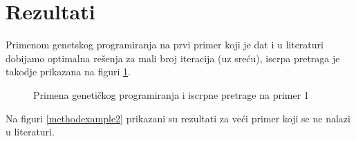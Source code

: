 \documentclass[a4paper, 12pt]{article}
\begin{document}
\newpage

\section{Rezultati}

Primenom genetskog programiranja na prvi primer koji je dat i u literaturi \cite{OnLocalRegisterAllocation} dobijamo optimalna rešenja za mali broj iteracija (uz sreću), iscrpa pretraga je takodje prikazana na figuri \ref{methodexample1}.

\begin{figure}
\centering
{}
\qquad
{}
\caption{Primena genetičkog programiranja i iscrpne pretrage na primer 1}
\label{methodexample1}
\end{figure}

Na figuri \ref{methodexample2} prikazani su rezultati za veći primer koji se ne nalazi u literaturi.
\end{document}
